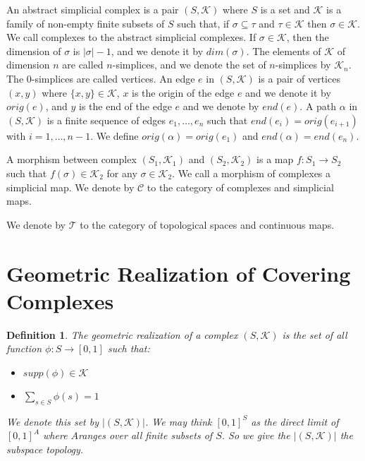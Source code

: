 \documentclass{amsart}
\newtheorem{definition}{Definition}[section]
\begin{document}
An abstract simplicial complex is a pair $(S,\mathcal{K})$ where $S$ is a set and $\mathcal{K}$ is a family of non-empty finite subsets of $S$ such that, if $\sigma\subseteq \tau$ and $\tau\in \mathcal{K}$ then $\sigma\in\mathcal{K}$. We call complexes to the abstract simplicial complexes.  If $\sigma\in \mathcal{K}$, then the dimension of $\sigma$ is $\vert\sigma\vert-1$, and we denote it by $dim(\sigma)$. The elements of $\mathcal{K}$ of dimension $n$ are called $n$-simplices, and we denote the set of $n$-simplices by $\mathcal{K}_n$. The $0$-simplices are called vertices. An edge $e$ in $(S,\mathcal{K})$ is a pair of vertices  $(x,y)$ where $\{x,y\}\in\mathcal{K}$, $x$ is the origin of the edge $e$ and we denote it by $orig(e)$, and $y$ is the end of the edge $e$ and we denote by $end(e)$. A path $\alpha$ in $(S,\mathcal{K})$ is a finite sequence of edges $e_1,\dots,e_n$ such that $end(e_i)=orig(e_{i+1})$ with $i=1,\dots,n-1$. We define $orig(\alpha)=orig(e_1)$ and $end(\alpha)=end(e_n)$. 

A morphism between complex $(S_1,\mathcal{K}_1)$ and $(S_2,\mathcal{K}_2)$ is a map $f\colon S_1\longrightarrow S_2$ such that $f(\sigma)\in \mathcal{K}_2$ for any $\sigma\in\mathcal{K}_2$. We call a morphism of complexes a simplicial map. We  denote by $\mathcal{C}$ to the category of complexes and simplicial maps.

We  denote by $\mathcal{T}$ to the category of topological spaces and continuous maps.

\section{Geometric Realization of Covering Complexes}

\begin{definition}
The geometric realization of a complex $(S,\mathcal{K})$ is the set of all function $\phi\colon S\longrightarrow [0,1]$ such that:
\begin{itemize}
\item $supp(\phi)\in\mathcal{K}$
\item $\sum_{s\in S}\phi(s)=1$
\end{itemize}
We denote this set by $\vert (S,\mathcal{K})\vert$. We may think $[0,1]^S$ as the direct limit of $[0,1]^A$ where $A$ranges over all finite subsets of $S$. So we give the $\vert (S,\mathcal{K})\vert$ the subspace topology.
\end{definition}
\end{document}
